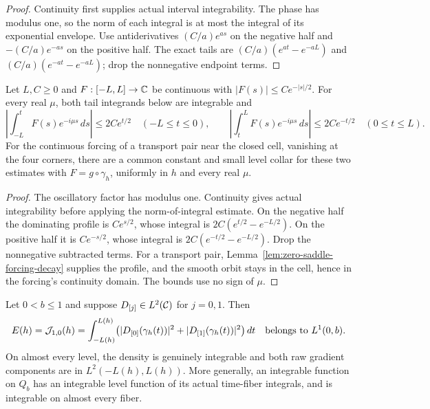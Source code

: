 \begin{proof}
\leanok
Continuity first supplies actual interval integrability.
The phase has modulus one, so the norm of each integral is at most
the integral of its exponential envelope.
Use antiderivatives $(C/a)e^{as}$ on the negative half and
$-(C/a)e^{-as}$ on the positive half.
The exact tails are $(C/a)(e^{at}-e^{-aL})$ and
$(C/a)(e^{-at}-e^{-aL})$; drop the nonnegative endpoint terms.
\end{proof}

\begin{lemma}
\label{lem:zero-saddle-forcing-tails}
\leanok
Let $L,C\ge0$ and $F:[-L,L]\to\mathbb{C}$ be continuous with
$|F(s)|\le Ce^{-|s|/2}$. For every real $\mu$, both tail integrands
below are integrable and
\[
 \left|\int_{-L}^t F(s)e^{-i\mu s}\,ds\right|
 \le2Ce^{t/2}\quad(-L\le t\le0),\qquad
 \left|\int_t^L F(s)e^{-i\mu s}\,ds\right|
 \le2Ce^{-t/2}\quad(0\le t\le L).
\]
For the continuous forcing of a transport pair near the closed cell,
vanishing at the four corners, there are a common constant and small
level collar for these two estimates with $F=g\circ\gamma_h$,
uniformly in $h$ and every real $\mu$.
\end{lemma}

\begin{proof}
\leanok
The oscillatory factor has modulus one. Continuity gives actual
integrability before applying the norm-of-integral estimate.
On the negative half the dominating profile is $Ce^{s/2}$, whose
integral is $2C(e^{t/2}-e^{-L/2})$.
On the positive half it is $Ce^{-s/2}$, whose integral is
$2C(e^{-t/2}-e^{-L/2})$. Drop the nonnegative subtracted terms.
For a transport pair, Lemma~\ref{lem:zero-saddle-forcing-decay} supplies
the profile, and the smooth orbit stays in the cell, hence in the
forcing's continuity domain. The bounds use no sign of $\mu$.
\end{proof}

\begin{lemma}
\label{lem:quarter-gradient-energy}
\leanok
Let $0<b\le1$ and suppose $D_{[j]}\in L^2(\mathcal{C})$ for $j=0,1$.
Then
\[
 E(h)=\mathcal J_{1,0}(h)
 =\int_{-L(h)}^{L(h)}
   \bigl(|D_{[0]}(\gamma_h(t))|^2+|D_{[1]}(\gamma_h(t))|^2\bigr)\,dt
 \quad\hbox{belongs to }L^1(0,b).
\]
On almost every level, the density is genuinely integrable and both
raw gradient components are in $L^2(-L(h),L(h))$.
More generally, an integrable function on $Q_b$ has an integrable
level function of its actual time-fiber integrals, and is integrable
on almost every fiber.
\end{lemma}

